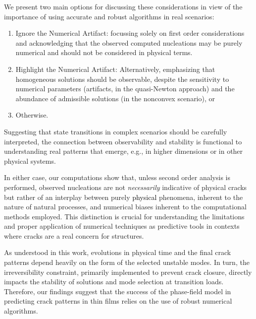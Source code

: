We present two main options for discussing these considerations in view of the importance of using accurate and robust algorithms in real scenarios:

\begin{enumerate}
      \item
            Ignore the Numerical Artifact: focussing solely on first order considerations and acknowledging that the observed computed nucleations may be purely numerical and should not be considered in physical terms.
      \item
            Highlight the Numerical Artifact: Alternatively, emphasizing that homogeneous solutions should be observable, despite
            the sensitivity to numerical parameters (artifacts, in the quasi-Newton approach) and the abundance of admissible solutions (in the nonconvex scenario), or
      \item
            Otherwise.
\end{enumerate}

Suggesting that state transitions in complex scenarios should be carefully interpreted, the connection between observability and stability is functional to understanding real patterns that emerge, e.g., in higher dimensions or in other physical systems.

In either case, our computations show that, unless second order analysis is performed, observed nucleations are not \emph{necessarily} indicative of physical cracks but rather of an interplay between purely   \textcolor{black}{physical} phenomena, inherent to the nature of natural processes, and numerical biases inherent to the computational methods employed. This distinction is crucial for understanding the limitations and proper application of numerical techniques as predictive tools in contexts where cracks are a real concern for structures.

      {As understood in this work, evolutions in physical time and the final crack patterns depend heavily on the form of the selected unstable modes. In turn, the irreversibility constraint, primarily implemented to prevent crack closure, directly impacts the stability of solutions and mode selection at transition loads. Therefore, our findings suggest that the success of the phase-field model in predicting crack patterns in thin films relies on the use of robust numerical algorithms.}

